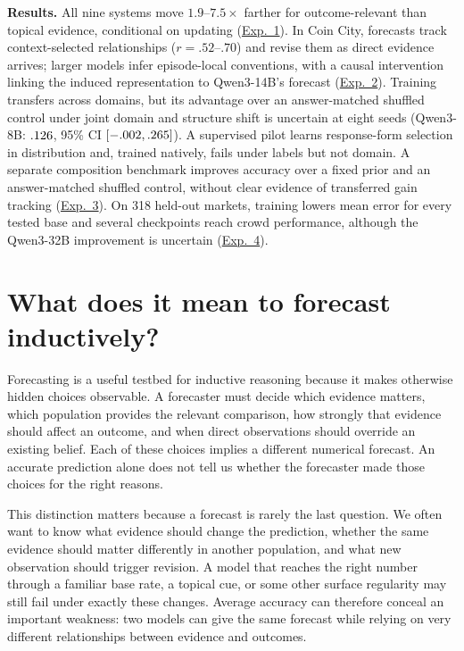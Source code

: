 \documentclass{article}
\begin{document}
\noindent\textbf{Results.}
All nine systems move $1.9$--$7.5\times$ farther for outcome-relevant than topical
evidence, conditional on updating (\hyperref[sec:exp1]{Exp.~1}). In Coin City,
forecasts track context-selected relationships ($r=.52$--$.70$) and revise them
as direct evidence arrives; larger models infer episode-local conventions, with
a causal intervention linking the induced representation to Qwen3-14B's forecast
(\hyperref[sec:exp2]{Exp.~2}). Training transfers across domains, but its
advantage over an answer-matched shuffled control under joint domain and structure
shift is uncertain at eight seeds (Qwen3-8B:
$.126{}$, 95\% CI $[-.002,.265]{}$). A supervised pilot learns response-form selection in distribution and, trained
natively, fails under labels but not domain. A separate composition benchmark improves
accuracy over a fixed prior and an answer-matched shuffled control, without
clear evidence of transferred gain tracking (\hyperref[sec:exp3]{Exp.~3}). On 318 held-out markets, training lowers mean
error for every tested base and several checkpoints reach crowd performance,
although the Qwen3-32B improvement is uncertain
(\hyperref[sec:exp4]{Exp.~4}).
\section{What does it mean to forecast inductively?}
\label{sec:inductive-forecasting}

Forecasting is a useful testbed for inductive reasoning because it makes
otherwise hidden choices observable. A forecaster must decide which evidence
matters, which population provides the relevant comparison, how strongly that
evidence should affect an outcome, and when direct observations should override
an existing belief. Each of these choices implies a different numerical
forecast. An accurate prediction alone does not tell us whether the forecaster
made those choices for the right reasons.

This distinction matters because a forecast is rarely the last question. We often
want to know what evidence should change the prediction, whether the same
evidence should matter differently in another population, and what new
observation should trigger revision. A model that reaches the right number
through a familiar base rate, a topical cue, or some other surface regularity may
still fail under exactly these changes. Average accuracy can therefore conceal an
important weakness: two models can give the same forecast while relying on very
different relationships between evidence and outcomes.
\end{document}
